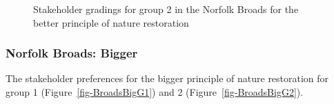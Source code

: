 \documentclass[
  12pt,
  letterpaper,
  DIV=11,
  numbers=noendperiod]{scrartcl}
\begin{document}
\begin{figure}[H]


\caption{\label{fig-BroadsBetterG2}Stakeholder gradings for group 2 in
the Norfolk Broads for the better principle of nature restoration}

\end{figure}%

\newpage{}

\subsubsection{Norfolk Broads: Bigger}\label{norfolk-broads-bigger}

The stakeholder preferences for the bigger principle of nature
restoration for group 1 (Figure~\ref{fig-BroadsBigG1}) and 2
(Figure~\ref{fig-BroadsBigG2}).
\end{document}
